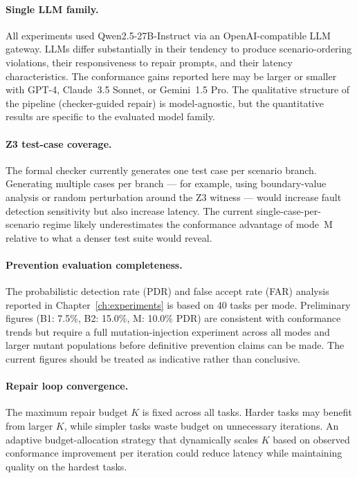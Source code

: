 \paragraph{Single LLM family.}
All experiments used Qwen2.5-27B-Instruct via an OpenAI-compatible LLM gateway.  LLMs differ substantially in their tendency
to produce scenario-ordering violations, their responsiveness to repair prompts, and their
latency characteristics.  The conformance gains reported here may be larger or smaller with
GPT-4, Claude~3.5 Sonnet, or Gemini~1.5 Pro.  The qualitative structure of the pipeline
(checker-guided repair) is model-agnostic, but the quantitative results are specific to the
evaluated model family.

\paragraph{Z3 test-case coverage.}
The formal checker currently generates one test case per scenario branch.  Generating
multiple cases per branch — for example, using boundary-value analysis or random
perturbation around the Z3 witness — would increase fault detection sensitivity but also
increase latency.  The current single-case-per-scenario regime likely underestimates the
conformance advantage of mode~M relative to what a denser test suite would reveal.

\paragraph{Prevention evaluation completeness.}
The probabilistic detection rate (PDR) and false accept rate (FAR) analysis reported in
Chapter~\ref{ch:experiments} is based on 40 tasks per mode.  Preliminary figures
(B1: 7.5\%, B2: 15.0\%, M: 10.0\% PDR) are consistent with conformance trends but require
a full mutation-injection experiment across all modes and larger mutant populations before
definitive prevention claims can be made.  The current figures should be treated as
indicative rather than conclusive.

\paragraph{Repair loop convergence.}
The maximum repair budget $K$ is fixed across all tasks.  Harder tasks may benefit from
larger $K$, while simpler tasks waste budget on unnecessary iterations.  An adaptive
budget-allocation strategy that dynamically scales $K$ based on observed conformance
improvement per iteration could reduce latency while maintaining quality on the hardest
tasks.


